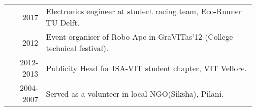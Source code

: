 %
%





\begin{tabular}{rl}	
	\textsc{2017} & Electronics engineer at student racing team, Eco-Runner TU Delft.\\
	\textsc{2012} & Event organiser of Robo-Ape in GraVITas'12 (College technical festival). \\
	\textsc{2012-2013} & Publicity Head for ISA-VIT student chapter, VIT Vellore. \\
	\textsc{2004-2007} & Served as a volunteer in local NGO(Siksha), Pilani.\\
\end{tabular}